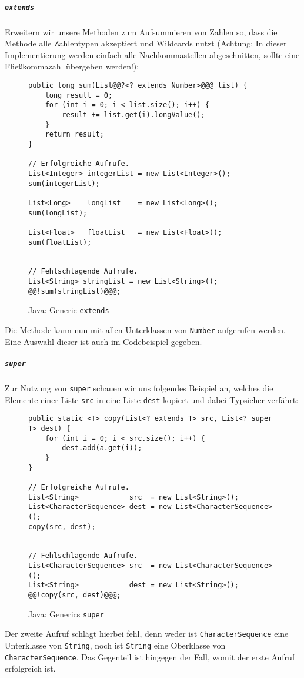			\subparagraph{\texttt{extends}}
				Erweitern wir unsere Methoden zum Aufsummieren von Zahlen so, dass die Methode alle Zahlentypen akzeptiert und Wildcards nutzt (Achtung: In dieser Implementierung werden einfach alle Nachkommastellen abgeschnitten, sollte eine Fließkommazahl übergeben werden!):
				\begin{figure}[H]
					\centering
					\begin{lstlisting}
public long sum(List@@?<? extends Number>@@@ list) {
	long result = 0;
	for (int i = 0; i < list.size(); i++) {
		result += list.get(i).longValue();
	}
	return result;
}

// Erfolgreiche Aufrufe.
List<Integer> integerList = new List<Integer>();
sum(integerList);

List<Long>    longList    = new List<Long>();
sum(longList);

List<Float>   floatList   = new List<Float>();
sum(floatList);


// Fehlschlagende Aufrufe.
List<String> stringList = new List<String>();
@@!sum(stringList)@@@;
					\end{lstlisting}
					\caption{Java: Generic \texttt{extends}}
				\end{figure}
				Die Methode kann nun mit allen Unterklassen von \texttt{Number} aufgerufen werden. Eine Auswahl dieser ist auch im Codebeispiel gegeben.
			
			\subparagraph{\texttt{super}}
				Zur Nutzung von \texttt{super} schauen wir uns folgendes Beispiel an, welches die Elemente einer Liste \texttt{src} in eine Liste \texttt{dest} kopiert und dabei Typsicher verfährt:
				\begin{figure}[H]
					\centering
					\begin{lstlisting}
public static <T> copy(List<? extends T> src, List<? super T> dest) {
	for (int i = 0; i < src.size(); i++) {
		dest.add(a.get(i));
	}
}

// Erfolgreiche Aufrufe.
List<String>            src  = new List<String>();
List<CharacterSequence> dest = new List<CharacterSequence>();
copy(src, dest);


// Fehlschlagende Aufrufe.
List<CharacterSequence> src  = new List<CharacterSequence>();
List<String>            dest = new List<String>();
@@!copy(src, dest)@@@;
					\end{lstlisting}
					\caption{Java: Generics \texttt{super}}
				\end{figure}
				Der zweite Aufruf schlägt hierbei fehl, denn weder ist \texttt{CharacterSequence} eine Unterklasse von \texttt{String}, noch ist \texttt{String} eine Oberklasse von \texttt{CharacterSequence}. Das Gegenteil ist hingegen der Fall, womit der erste Aufruf erfolgreich ist.
			
